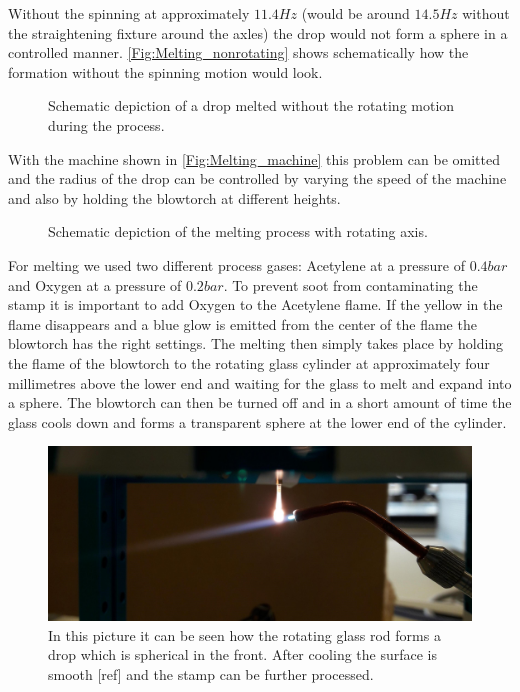 Without the spinning at approximately $11.4\si{Hz}$ (would be around $14.5\si{Hz}$ without the straightening fixture around the axles) the drop would not form a sphere in a controlled manner. \autoref{Fig:Melting_nonrotating} shows schematically how the formation without the spinning motion would look.
\begin{figure}[H]
	
	\caption{Schematic depiction of a drop melted without the rotating motion during the process.}
	\label{Fig:Melting_nonrotating}
\end{figure}
With the machine shown in \autoref{Fig:Melting_machine} this problem can be omitted and the radius of the drop can be controlled by varying the speed of the machine and also by holding the blowtorch at different heights.
\begin{figure}[H]
	
	\caption{Schematic depiction of the melting process with rotating axis.}
\end{figure}
For melting we used two different process gases: Acetylene at a pressure of $0.4\si{bar}$ and Oxygen at a pressure of $0.2\si{bar}$. To prevent soot from contaminating the stamp it is important to add Oxygen to the Acetylene flame. If the yellow in the flame disappears and a blue glow is emitted from the center of the flame the blowtorch has the right settings. The melting then simply takes place by holding the flame of the blowtorch to the rotating glass cylinder at approximately four millimetres above the lower end and waiting for the glass to melt and expand into a sphere. The blowtorch can then be turned off and in a short amount of time the glass cools down and forms a transparent sphere at the lower end of the cylinder.
\begin{figure}[H]
	\includegraphics[scale=0.13]{source/melting}
	\caption{In this picture it can be seen how the rotating glass rod forms a drop which is spherical in the front. After cooling the surface is smooth [ref] and the stamp can be further processed.}
\end{figure}

